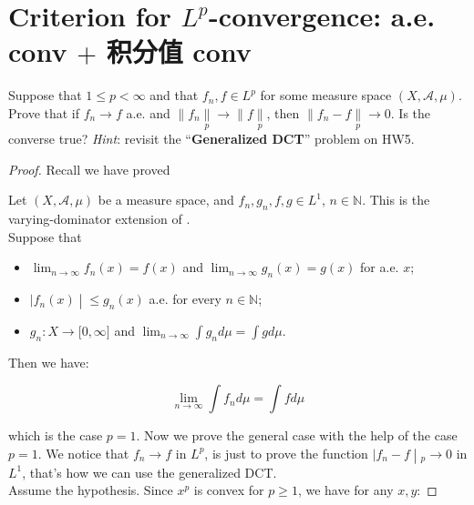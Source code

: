 \section{\texorpdfstring{Criterion for \(L^{p}\)-convergence: a.e. conv \(+\) 积分值 conv}{Criterion for L\^{}\{p\}-convergence: a.e. conv + 积分值 conv}}

Suppose that \(1 \leq p < \infty\) and that \(f_{n},f \in L^{p}\) for some measure space \((X,\mathcal{A},\mu)\). Prove that if \(f_{n}\rightarrow f\) a.e. and \(\parallel f_{n}\underset{p}{\parallel}\rightarrow \parallel f\underset{p}{\parallel}\), then \(\parallel f_{n} - f\underset{p}{\parallel}\rightarrow 0\). Is the converse true? \emph{Hint}: revisit the ``\textbf{Generalized DCT}'' problem on HW5.

\begin{proof}

Recall we have proved

\begin{theorem}{}

Let \((X,\mathcal{A},\mu)\) be a measure space, and \(f_{n},g_{n},f,g \in L^{1}\), \(n \in \mathbb{N}\). This is the varying-dominator extension of .\\
Suppose that

\begin{itemize}
\item
  \(\lim_{n\rightarrow\infty}f_{n}(x) = f(x)\) and \(\lim_{n\rightarrow\infty}g_{n}(x) = g(x)\) for a.e. \(x\);
\item
  \(\left. |f_{n}(x) \middle| \leq g_{n}(x) \right.\) a.e. for every \(n \in \mathbb{N}\);
\item
  \(g_{n}:X\rightarrow\lbrack 0,\infty\rbrack\) and \(\lim_{n\rightarrow\infty}\int g_{n} d\mu = \int g d\mu\).
\end{itemize}

Then we have:

\[\lim\limits_{n\rightarrow\infty}\int f_{n} d\mu = \int f d\mu\]

\end{theorem}

which is the case \(p = 1\). Now we prove the general case with the help of the case \(p = 1\). We notice that \(f_{n}\rightarrow f\) in \(L^{p}\), is just to prove the function \(\left. |f_{n} - f \middle| {}_{p}\rightarrow 0 \right.\) in \(L^{1}\), that's how we can use the generalized DCT.\\
Assume the hypothesis. Since \(x^{p}\) is convex for \(p \geq 1\), we have for any \(x,y\):


\end{proof}
